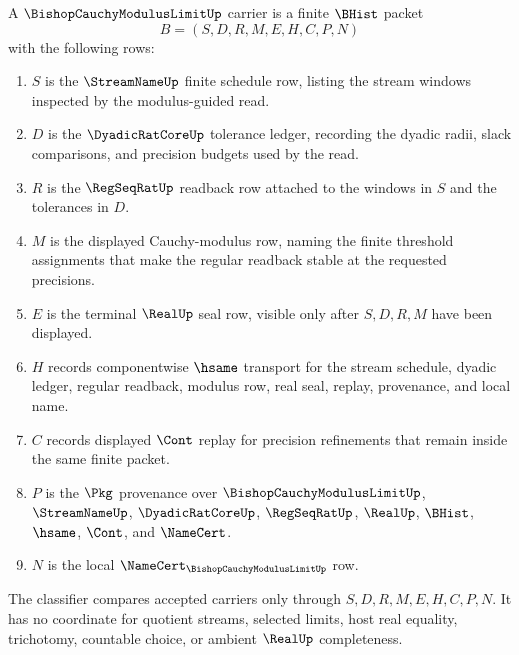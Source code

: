 \begin{definition}
\label{def:bishop-cauchy-modulus-limit-carrier}
A $\BishopCauchyModulusLimitUp$ carrier is a finite $\BHist$ packet
$$
B=(S,D,R,M,E,H,C,P,N)
$$
with the following rows:
\begin{enumerate}
\item $S$ is the $\StreamNameUp$ finite schedule row, listing the stream windows inspected by the modulus-guided read.
\item $D$ is the $\DyadicRatCoreUp$ tolerance ledger, recording the dyadic radii, slack comparisons, and precision budgets used by the read.
\item $R$ is the $\RegSeqRatUp$ readback row attached to the windows in $S$ and the tolerances in $D$.
\item $M$ is the displayed Cauchy-modulus row, naming the finite threshold assignments that make the regular readback stable at the requested precisions.
\item $E$ is the terminal $\RealUp$ seal row, visible only after $S,D,R,M$ have been displayed.
\item $H$ records componentwise $\hsame$ transport for the stream schedule, dyadic ledger, regular readback, modulus row, real seal, replay, provenance, and local name.
\item $C$ records displayed $\Cont$ replay for precision refinements that remain inside the same finite packet.
\item $P$ is the $\Pkg$ provenance over $\BishopCauchyModulusLimitUp$, $\StreamNameUp$, $\DyadicRatCoreUp$, $\RegSeqRatUp$, $\RealUp$, $\BHist$, $\hsame$, $\Cont$, and $\NameCert$.
\item $N$ is the local $\NameCert_{\BishopCauchyModulusLimitUp}$ row.
\end{enumerate}
The classifier compares accepted carriers only through $S,D,R,M,E,H,C,P,N$. It has no coordinate for quotient streams, selected limits, host real equality, trichotomy, countable choice, or ambient $\RealUp$ completeness.
\end{definition}

